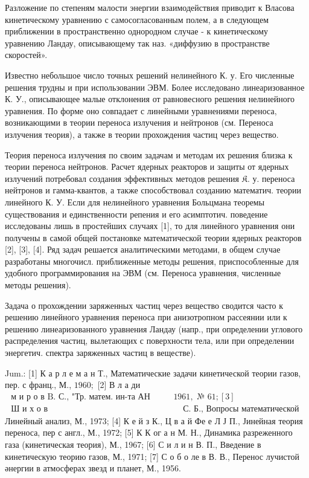 \documentclass[10pt]{article}
\begin{document}
Разложение по степеням малости энергии взаимодействия приводит к Власова кинетическому уравнению с самосогласованным полем, а в следующем приближении в пространственно однородном случае - к кинетическому уравнению Ландау, описывающему так наз. «диффузию в пространстве скоростей».



Известно небольшое число точных решений нелинейного К. у. Его численные решения трудны и при использовании ЭВМ. Более исследовано линеаризованное К. У., описывающее малые отклонения от равновесного решения нелинейного уравнения. По форме оно совпадает с линейными уравнениями переноса, возникающими в теории переноса излучения и нейтронов (см. Переноса излучения теория), а также в теории прохождения частиц через вещество.



Теория переноса излучения по своим задачам и методам их решения близка к теории переноса нейтронов. Расчет ядерных реакторов и защиты от ядерных излучений потребовал создания эффективных методов решения $\mathfrak{K}$. у. переноса нейтронов и гамма-квантов, а также способствовал созданию математич. теории линейного К. У. Если для нелинейного уравнения Больцмана теоремы существования и единственности репения и его асимптотич. поведение исследованы лишь в простейших случаях [1], то для линейного уравнения они получены в самой общей постановке математической теории ядерных реакторов [2], [3], [4]. Ряд задач решается аналитическими методами, в общем случае разработаны многочисл. приближенные методы решения, приспособленные для удобного программирования на ЭВМ (см. Переноса уравнения, численные методы решения).



Задача о прохождении заряженных частиц через вещество сводится часто к решению линейного уравнения переноса при анизотропном рассеянии или к решению линеаризованного уравнения Ландау (напр., при определении углового распределения частиц, вылетающих с поверхности тела, или при определении энергетич. спектра заряженных частиц в веществе).



Jum.: [1] К а р л е м а н Т., Математические задачи кинетической теории газов, пер. с франц., М., $1960 ;$ [2] В л а ди$\begin{array}{ll}\text { м и р о в B. С., "Тр. матем. ин-та АН СССР», } 1961, \text { № } 61 ;[3] \\ \text { Ш и х о в } & \text { С. Б., Вопросы математической теории реакторов. }\end{array}$ Линейный анализ, М., 1973; [4] К е й з К., Ц в а й Фе е Л Ј П., Јинейная теория переноса, пер с англ., М., 1972; [5] К К ог а н М. Н., Динамика разреженного газа (кинетическая теория), М., 1967; [6] С и л и н В. П., Введение в кинетическую теорию газов, М., 1971; [7] С о б о ле в В. В., Перенос лучистой әнергии в атмосферах звезд и планет, М., 1956.
\end{document}
